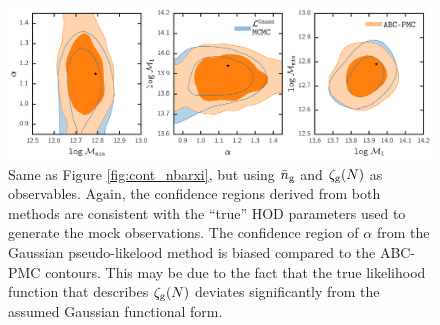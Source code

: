 \begin{figure}
\includegraphics[width=1.\textwidth]{figs/abc/paper_ABCvsMCMC_contour_nbargmf.pdf}
\caption{\label{fig:cont_nbargmf} 
Same as Figure \ref{fig:cont_nbarxi}, but using $\bar{n}_{\mathrm{g}}$ and $\mathcal{\zeta}_{\rm g}(N)$ as 
observables. Again, the confidence regions derived from both methods are 
consistent with the ``true'' HOD parameters used to generate the mock 
observations. The confidence region of $\alpha$ from the Gaussian 
pseudo-likelood method is biased compared to the ABC-PMC contours. 
This may be due to the fact that the true likelihood function that 
describes $\mathcal{\zeta}_{\rm g}(N)$ deviates significantly from the assumed Gaussian 
functional form.}
\end{figure}
